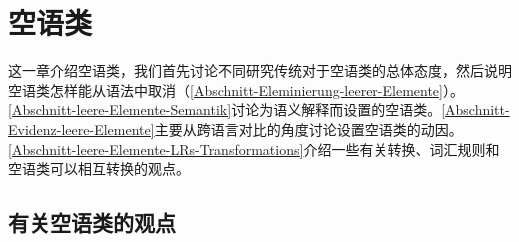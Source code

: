 
\chapter{空语类}
\label{Abschnitt-Diskussion-leere-Elemente}
\label{chap-empty}

这一章介绍空语类，我们首先讨论不同研究传统对于空语类的总体态度，然后说明空语类怎样能从语法中取消（\ref{Abschnitt-Eleminierung-leerer-Elemente}）。\ref{Abschnitt-leere-Elemente-Semantik}讨论为语义解释而设置的空语类。\ref{Abschnitt-Evidenz-leere-Elemente}主要从跨语言对比的角度讨论设置空语类的动因。\ref{Abschnitt-leere-Elemente-LRs-Transformations}介绍一些有关转换、词汇规则和空语类可以相互转换的观点。

\section{有关空语类的观点}


